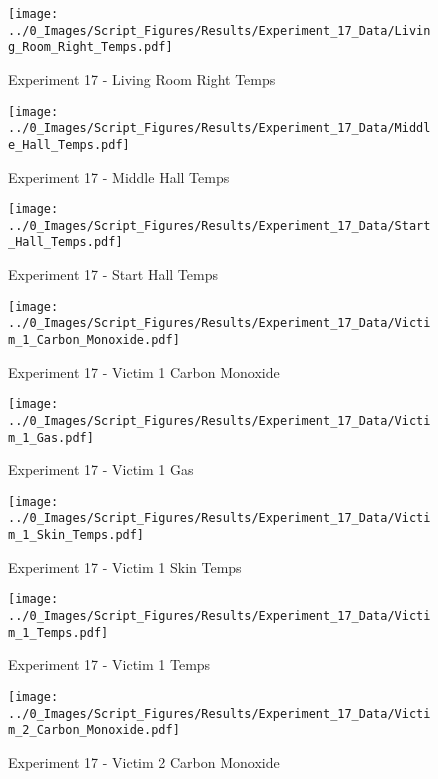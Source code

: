 	\clearpage

	\begin{figure}[H]
		\centering
		\texttt{[image: ../0\_Images/Script\_Figures/Results/Experiment\_17\_Data/Living\_Room\_Right\_Temps.pdf]}
		\caption[]{Experiment 17 - Living Room Right Temps}
	\end{figure}
 

	\begin{figure}[H]
		\centering
		\texttt{[image: ../0\_Images/Script\_Figures/Results/Experiment\_17\_Data/Middle\_Hall\_Temps.pdf]}
		\caption[]{Experiment 17 - Middle Hall Temps}
	\end{figure}
 
	\clearpage

	\begin{figure}[H]
		\centering
		\texttt{[image: ../0\_Images/Script\_Figures/Results/Experiment\_17\_Data/Start\_Hall\_Temps.pdf]}
		\caption[]{Experiment 17 - Start Hall Temps}
	\end{figure}
 

	\begin{figure}[H]
		\centering
		\texttt{[image: ../0\_Images/Script\_Figures/Results/Experiment\_17\_Data/Victim\_1\_Carbon\_Monoxide.pdf]}
		\caption[]{Experiment 17 - Victim 1 Carbon Monoxide}
	\end{figure}
 
	\clearpage

	\begin{figure}[H]
		\centering
		\texttt{[image: ../0\_Images/Script\_Figures/Results/Experiment\_17\_Data/Victim\_1\_Gas.pdf]}
		\caption[]{Experiment 17 - Victim 1 Gas}
	\end{figure}
 

	\begin{figure}[H]
		\centering
		\texttt{[image: ../0\_Images/Script\_Figures/Results/Experiment\_17\_Data/Victim\_1\_Skin\_Temps.pdf]}
		\caption[]{Experiment 17 - Victim 1 Skin Temps}
	\end{figure}
 
	\clearpage

	\begin{figure}[H]
		\centering
		\texttt{[image: ../0\_Images/Script\_Figures/Results/Experiment\_17\_Data/Victim\_1\_Temps.pdf]}
		\caption[]{Experiment 17 - Victim 1 Temps}
	\end{figure}
 

	\begin{figure}[H]
		\centering
		\texttt{[image: ../0\_Images/Script\_Figures/Results/Experiment\_17\_Data/Victim\_2\_Carbon\_Monoxide.pdf]}
		\caption[]{Experiment 17 - Victim 2 Carbon Monoxide}
	\end{figure}
 

